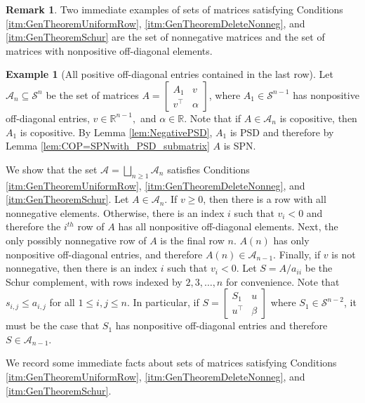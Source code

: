 \documentclass{amsart}
\newcommand{\bbR}{\mathbb{R}}
\newcommand{\cA}{\mathcal{A}}
\newcommand{\cS}{\mathcal{S}}
\theoremstyle{definition}
\newtheorem{example}[theorem]{Example}
\newtheorem{remark}[theorem]{Remark}
\begin{document}
\begin{remark}
Two immediate examples of sets of matrices satisfying Conditions \ref{itm:GenTheoremUniformRow}, \ref{itm:GenTheoremDeleteNonneg}, and \ref{itm:GenTheoremSchur} are the set of nonnegative matrices and the set of matrices with nonpositive off-diagonal elements.
\end{remark}

\begin{example}[All positive off-diagonal entries contained in the last row]

Let $\cA_n\subseteq \cS^n$ be the set of matrices $A = \begin{bmatrix} A_1 & v\\ v^\top & \alpha\end{bmatrix}$, where $A_1 \in \cS^{n-1}$ has nonpositive off-diagonal entries, $v \in \bbR^{n-1},$ and $\alpha \in \bbR$. Note that if $A \in \cA_n$ is copositive, then $A_1$ is copositive. By Lemma \ref{lem:NegativePSD}, $A_1$ is PSD and therefore by Lemma \ref{lem:COP=SPNwith_PSD_submatrix} $A$ is SPN. 

We show that the set $\cA = \bigsqcup_{n \geq 1}\cA_n$ satisfies Conditions \ref{itm:GenTheoremUniformRow}, \ref{itm:GenTheoremDeleteNonneg}, and \ref{itm:GenTheoremSchur}. Let $A \in \cA_n$. If $v \geq 0$, then there is a row with all nonnegative elements. Otherwise, there is an index $i$ such that $v_i < 0$ and therefore the $i^{th}$ row of $A$ has all nonpositive off-diagonal elements. Next, the only possibly nonnegative row of $A$ is the final row $n$. $A(n)$ has only nonpositive off-diagonal entries, and therefore $A(n)\in \cA_{n-1}$. Finally, if $v$ is not nonnegative, then there is an index $i$ such that $v_i < 0$. Let $S = A/a_{ii}$ be the Schur complement, with rows indexed by $2,3,\ldots, n$ for convenience. Note that $s_{i,j} \leq a_{i,j}$ for all $1\leq i,j \leq n$. In particular, if $S = \begin{bmatrix} S_1 & u\\ u^\top & \beta \end{bmatrix}$ where $S_1 \in \cS^{n-2}$, it must be the case that $S_1$ has nonpositive off-diagonal entries and therefore $S \in \cA_{n-1}$. 
\end{example}

We record some immediate facts about sets of matrices satisfying Conditions \ref{itm:GenTheoremUniformRow},  \ref{itm:GenTheoremDeleteNonneg}, and \ref{itm:GenTheoremSchur}.
\end{document}
